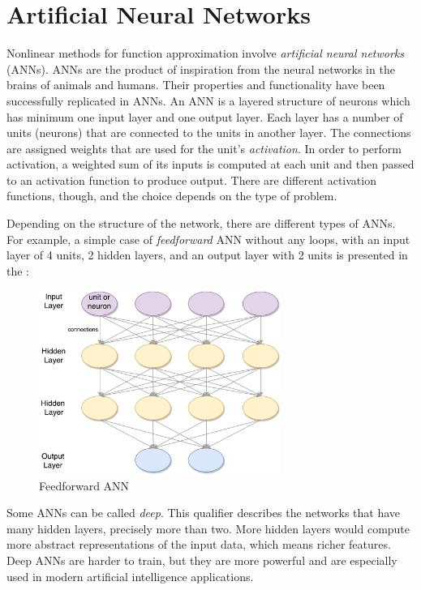 \section{Artificial Neural Networks}\label{ANNsection}
Nonlinear methods for function approximation involve \textit{artificial neural networks} (ANNs). ANNs are the product of inspiration from the neural networks in the brains of animals and humans. Their properties and functionality have been successfully replicated in ANNs. An ANN is a layered structure of neurons which has minimum one input layer and one output layer. Each layer has a number of units (neurons) that are connected to the units in another layer. The connections are assigned weights that are used for the unit's \textit{activation}. In order to perform activation, a weighted sum of its inputs is computed at each unit and then passed to an activation function to produce output. There are different activation functions, though, and the choice depends on the type of problem.

Depending on the structure of the network, there are different types of ANNs. For example, a simple case of \textit{feedforward} ANN without any loops, with an input layer of 4 units, 2 hidden layers, and an output layer with 2 units is presented in the :
\begin{figure}[H]
	\centering
	\includegraphics[width=0.7\textwidth]{Figures/Feedforward}
	\caption{Feedforward ANN}
	\label{fig:feedforward}
\end{figure}
Some ANNs can be called \textit{deep}. This qualifier describes the networks that have many hidden layers, precisely more than two. More hidden layers would compute more abstract representations of the input data, which means richer features. Deep ANNs are harder to train, but they are more powerful and are especially used in modern artificial intelligence applications.

